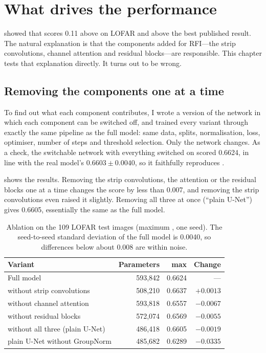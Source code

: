 \chapter{What drives the performance}
\label{ch:drivers}
 showed that \hybrid{} scores 0.11 above \tfunet{} on LOFAR and
above the best published result. The natural explanation is that the
components added for RFI---the strip convolutions, channel attention and
residual blocks---are responsible. This chapter tests that explanation
directly. It turns out to be wrong.

\section{Removing the components one at a time}
\label{sec:ablation}
To find out what each component contributes, I wrote a version of the network
in which each component can be switched off, and trained every variant
through exactly the same pipeline as the full model: same data, splits,
normalisation, loss, optimiser, number of steps and threshold selection. Only
the network changes. As a check, the switchable network with everything
switched on scored 0.6624, in line with the real model's $0.6603 \pm 0.0040$, so
it faithfully reproduces \hybrid{}.

 shows the results. Removing the strip convolutions,
the attention or the residual blocks one at a time changes the score by less
than 0.007, and removing the strip convolutions even raised it slightly.
Removing all three at once (``plain U-Net'') gives 0.6605, essentially the same
as the full model.

\begin{table}[H]
  \centering
  \caption{Ablation on the 109 LOFAR test images (maximum \Fone{}, one seed).
    The seed-to-seed standard deviation of the full model is 0.0040, so
    differences below about 0.008 are within noise.}
  \label{tab:ablation}
  \begin{tabular}{lrrr}
    \toprule
    Variant & Parameters & max \Fone{} & Change \\
    \midrule
    Full model                                   & 593{,}842 & 0.6624 & --- \\
    without strip convolutions                   & 508{,}210 & 0.6637 & $+0.0013$ \\
    without channel attention                    & 593{,}818 & 0.6557 & $-0.0067$ \\
    without residual blocks                      & 572{,}074 & 0.6569 & $-0.0055$ \\
    without all three (plain U-Net)              & 486{,}418 & 0.6605 & $-0.0019$ \\
    plain U-Net without GroupNorm                & 485{,}682 & 0.6289 & $-0.0335$ \\
    \bottomrule
  \end{tabular}
\end{table}

